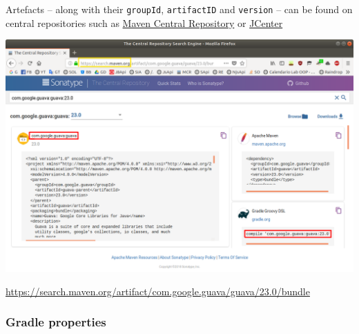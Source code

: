 \documentclass[handout]{beamer}\mode<presentation>{\usetheme{AMSCesenaBleu}}
\begin{document}
\begin{frame}[allowframebreaks]
    \framebreak
    
    Artefacts -- along with their \texttt{groupId}, \texttt{artifactID} and \texttt{version} -- can be found on central repositories such as \href{https://search.maven.org/}{Maven Central Repository} or \href{https://bintray.com/bintray/jcenter}{JCenter}
    \begin{center}
        \includegraphics[width=.7\linewidth]{./res/img/mcr.png}
        
        {\scriptsize\url{https://search.maven.org/artifact/com.google.guava/guava/23.0/bundle}}
    \end{center}
    
\end{frame}

\subsubsection{Gradle properties}
\end{document}
